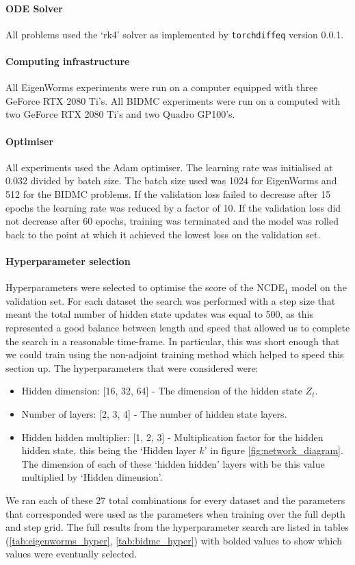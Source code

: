\documentclass{article}
\begin{document}
\paragraph{ODE Solver} All problems used the `rk4' solver as implemented by \texttt{torchdiffeq} \citep{torchdiffeq} version 0.0.1.

\paragraph{Computing infrastructure} All EigenWorms experiments were run on a computer equipped with three GeForce RTX 2080 Ti's. All BIDMC experiments were run on a computed with two GeForce RTX 2080 Ti's and two Quadro GP100's.

\paragraph{Optimiser} All experiments used the Adam optimiser. The learning rate was initialised at $0.032$ divided by batch size. The batch size used was 1024 for EigenWorms and 512 for the BIDMC problems. If the validation loss failed to decrease after 15 epochs the learning rate was reduced by a factor of 10. If the validation loss did not decrease after 60 epochs, training was terminated and the model was rolled back to the point at which it achieved the lowest loss on the validation set. 

\paragraph{Hyperparameter selection} Hyperparameters were selected to optimise the score of the NCDE$_1$ model on the validation set. For each dataset the search was performed with a step size that meant the total number of hidden state updates was equal to 500, as this represented a good balance between length and speed that allowed us to complete the search in a reasonable time-frame. In particular, this was short enough that we could train using the non-adjoint training method which helped to speed this section up. The hyperparameters that were considered were:
\begin{itemize}
    \item Hidden dimension: [16, 32, 64] - The dimension of the hidden state $Z_t$.
    \item Number of layers: [2, 3, 4] - The number of hidden state layers.
    \item Hidden hidden multiplier: [1, 2, 3] - Multiplication factor for the hidden hidden state, this being the `Hidden layer $k$' in figure \ref{fig:network_diagram}. The dimension of each of these `hidden hidden' layers with be this value multiplied by `Hidden dimension'.
\end{itemize}
We ran each of these 27 total combinations for every dataset and the parameters that corresponded were used as the parameters when training over the full depth and step grid. The full results from the hyperparameter search are listed in tables (\ref{tab:eigenworms_hyper}, \ref{tab:bidmc_hyper}) with bolded values to show which values were eventually selected. 
\end{document}
